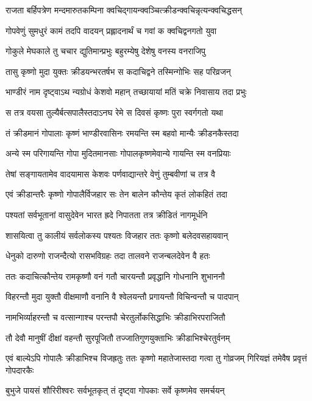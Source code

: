 \twolineshloka
{राजता बर्हिपत्रेण मन्दमारुतकम्पिना}
{क्वचिद्गायन्क्वञ्चित्क्रीडन्क्वचिन्नृत्यन्क्वचिद्धसन्}


\twolineshloka
{गोपवेणुं सुमधुरं कामं तदपि वादयन्}
{प्रह्लादनार्थं च गवां क क्वचिद्वनगतो युवा}


\twolineshloka
{गोकुले मेघकाले तु चचार द्युतिमान्प्रभुः}
{बहुरम्येषु देशेषु वनस्य वनराजिपु}


\twolineshloka
{तासु कृष्णो मुदा युक्तः क्रीडयन्भरतर्षभ}
{स कदाचिद्वने तस्मिन्गोभिः सह परिव्रजन्}


\twolineshloka
{भाण्डीरं नाम दृष्ट्वाऽथ न्यग्रोधं केशवो महान्}
{तच्छायायां मतिं चक्रे निवासाय तदा प्रभुः}


\twolineshloka
{स तत्र वयसा तुल्यैर्बत्सपालैस्तदाऽनघ}
{रेमे स दिवसं कृष्णः पुरा स्वर्गगतो यथा}


\twolineshloka
{तं क्रीडमानं गोपालाः कृष्णं भाण्डीरवासिनः}
{रमयन्ति स्म बहवो मान्यैः क्रीडनकैस्तदा}


\twolineshloka
{अन्ये स्म परिगायन्ति गोपा मुदितमानसाः}
{गोपालकृष्णमेवान्ये गायन्ति स्म वनप्रियाः}


\twolineshloka
{तेषां सङ्गायतामेव वादयामास केशवः}
{पर्णवाद्यान्तरे वेणुं तुम्बवीणां च तत्र वै}


\twolineshloka
{एवं क्रीडान्तरैः कृष्णो गोपालैर्विजहार सः}
{तेन बालेन कौन्तेय कृतं लोकहितं तदा}


\twolineshloka
{पश्यतां सर्वभूतानां वासुदेवेन भारत}
{ह्रदे निपातता तत्र क्रीडितं नागमूर्धनि}


\twolineshloka
{शासयित्वा तु कालीयं सर्वलोकस्य पश्यतः}
{विजहार ततः कृष्णो बलेदवसहायवान्}


\twolineshloka
{धेनुको दारुणो राजन्दैत्यो रासभविग्रहः}
{तदा तालवने राजन्बलदेवेन वै हतः}


\twolineshloka
{ततः कदाचित्कौन्तेय रामकृष्णौ वनं गतौ}
{चारयन्तौ प्रवृद्धानि गोधनानि शुभाननौ}


\twolineshloka
{विहरन्तौ मुदा युक्तौ वीक्षमाणौ वनानि वै}
{श्वेलयन्तौ प्रगायन्तौ विचिन्वन्तौ च पादपान्}


\twolineshloka
{नामभिर्व्याहरन्तौ च वत्सान्गाश्च परन्तपौ}
{चेरतुर्लोकसिद्धाभिः क्रीडाभिरपराजितौ}


\twolineshloka
{तौ देवौ मानुषीं दीक्षां वहन्तौ सुरपूजितौ}
{तज्जातिगुणयुक्ताभिः क्रीडाभिश्चेरतुर्वनम्}


एवं बाल्येऽपि गोपालैः क्रीडाभिश्च विजह्रतुः
\twolineshloka
{ततः कृष्णो महातेजास्तदा गत्वा तु गोव्रजम्}
{गिरियज्ञं तमेवैष प्रवृत्तं गोपदारकैः}


\twolineshloka
{बुभुजे पायसं शौरिरीश्वरः सर्वभूतकृत्}
{तं दृष्ट्वा गोपकाः सर्वे कृष्णमेव समर्चयन्}


